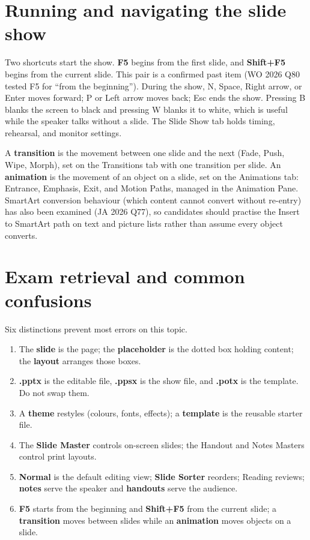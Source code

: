 \section{Running and navigating the slide show}
Two shortcuts start the show. \textbf{F5} begins from the first slide, and
\textbf{Shift+F5} begins from the current slide. This pair is a confirmed past
item (WO 2026 Q80 tested F5 for ``from the beginning''). During the show, N,
Space, Right arrow, or Enter moves forward; P or Left arrow moves back; Esc
ends the show. Pressing B blanks the screen to black and pressing W blanks it
to white, which is useful while the speaker talks without a slide. The Slide
Show tab holds timing, rehearsal, and monitor settings.

A \textbf{transition} is the movement between one slide and the next (Fade,
Push, Wipe, Morph), set on the Transitions tab with one transition per slide.
An \textbf{animation} is the movement of an object on a slide, set on the
Animations tab: Entrance, Emphasis, Exit, and Motion Paths, managed in the
Animation Pane. SmartArt conversion behaviour (which content cannot convert
without re-entry) has also been examined (JA 2026 Q77), so candidates should
practise the Insert to SmartArt path on text and picture lists rather than
assume every object converts.

\section{Exam retrieval and common confusions}
Six distinctions prevent most errors on this topic.
\begin{enumerate}
  \item The \textbf{slide} is the page; the \textbf{placeholder} is the
    dotted box holding content; the \textbf{layout} arranges those boxes.
  \item \textbf{.pptx} is the editable file, \textbf{.ppsx} is the show file,
    and \textbf{.potx} is the template. Do not swap them.
  \item A \textbf{theme} restyles (colours, fonts, effects); a
    \textbf{template} is the reusable starter file.
  \item The \textbf{Slide Master} controls on-screen slides; the Handout and
    Notes Masters control print layouts.
  \item \textbf{Normal} is the default editing view; \textbf{Slide Sorter}
    reorders; Reading reviews; \textbf{notes} serve the speaker and
    \textbf{handouts} serve the audience.
  \item \textbf{F5} starts from the beginning and \textbf{Shift+F5} from the
    current slide; a \textbf{transition} moves between slides while an
    \textbf{animation} moves objects on a slide.
\end{enumerate}

